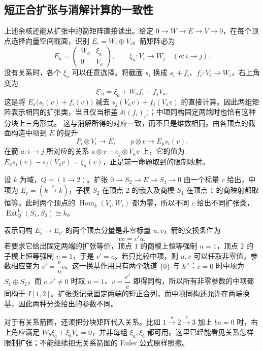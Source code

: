 \subsection{短正合扩张与消解计算的一致性}
\label{b5:subsec:0904:04}

上述余核还能从扩张中的箭矩阵直接读出。给定 \(0\to W\to E\to V\to0\)，在每个顶点选择向量空间截面，识别 \(E_i=W_i\oplus V_i\)。箭矩阵必为
\[
	E_a=
	\begin{pmatrix}
		W_a&\xi_a\\0&V_a
	\end{pmatrix},
	\qquad \xi_a:V_i\to W_j\quad(a:i\to j).
\]
没有关系时，各个 \(\xi_a\) 可以任意选择。将截面 \(s_i\) 换成 \(s_i+f_i\)、\(f_i:V_i\to W_i\)，右上角变为
\[
	\xi'_a=\xi_a+W_af_i-f_jV_a.
\]
这是将 \(E_a\bigl(s_i(v)+f_i(v)\bigr)\) 减去 \(s_j(V_av)+f_j(V_av)\) 的直接计算。因此两组矩阵表示相同的扩张类，当且仅当相差 \(\delta\bigl((f_i)_i\bigr)\)；中项同构固定两端时也恰有这种分块上三角形式。
\ProseParagraphBreak
这与消解所得的对应一致，而不只是维数相同。由各顶点的截面构造中项到 \(E\) 的提升
\[
	P_i\otimes V_i\longrightarrow E,\qquad p\otimes v\longmapsto E_p s_i(v).
\]
在箭 \(a:i\to j\) 所对应的关系 \(a\otimes v-e_j\otimes V_av\) 上，它的值为 \(E_as_i(v)-s_j(V_av)=\xi_a(v)\)，正是前一命题取到的限制映射。
\begin{example}\label{b5:exm:arrow-extension-parameter}
	设 \(k\) 为域，\(Q=(1\to2)\)。扩张 \(0\to S_2\to E\to S_1\to0\) 由一个标量 \(c\) 给出，中项为 \(E_c=(k\xrightarrow{c}k)\)，子模 \(S_2\) 在顶点 \(2\) 的嵌入及商模 \(S_1\) 在顶点 \(1\) 的商映射都取恒等。此时两个顶点的 \(\operatorname{Hom}_k(V_i,W_i)\) 都为零，所以不同 \(c\) 给出不同扩张类，\(\operatorname{Ext}_Q^1(S_1,S_2)\cong k\)。

	表示同构 \(E_c\to E_{c'}\) 的两个顶点分量是非零标量 \(u,v\)，箭的交换条件为
	\[
		vc=c'u.
	\]
	若要求它给出固定两端的扩张等价，顶点 \(1\) 的商模上恒等强制 \(u=1\)，顶点 \(2\) 的子模上恒等强制 \(v=1\)，于是 \(c'=c\)。若只比较中项，则 \(u,v\) 可以任取非零值，参数相应变为 \(c'=\dfrac vu c\)。这一换基作用只有两个轨道 \(\{0\}\) 与 \(k^\times\)：\(c=0\) 时中项为 \(S_1\oplus S_2\)，而 \(c,c'\ne0\) 时取 \(u=1\)、\(v=\dfrac{c'}c\) 即得同构，所以所有非零参数的中项都同构于 \(I[1,2]\)。扩张类记录固定两端的短正合列，而中项同构还允许在两端换基，因此两种分类给出的参数不同。
\end{example}
对于有关系箭图，还须把分块矩阵代入关系。比如 \(1\xrightarrow{a}2\xrightarrow{b}3\) 加上 \(ba=0\) 时，右上角应满足 \(W_b\xi_a+\xi_bV_a=0\)，并非每组 \(\xi_a,\xi_b\) 都可用。这里已经能看见关系怎样限制扩张；不能继续把无关系箭图的 Euler 公式原样照搬。

